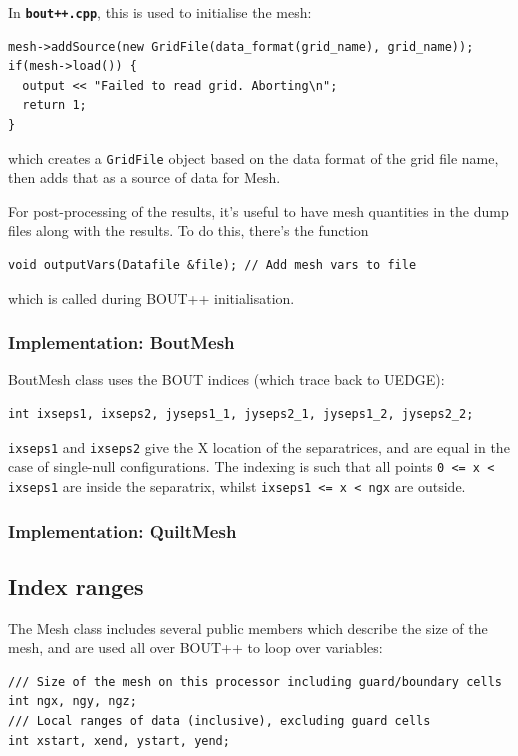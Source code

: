 \documentclass[12pt]{article}
\newcommand{\code}[1]{\texttt{#1}}
\newcommand{\file}[1]{\texttt{\bf #1}}
\begin{document}
In \file{bout++.cpp}, this is used to initialise the mesh:
\begin{lstlisting}
mesh->addSource(new GridFile(data_format(grid_name), grid_name));
if(mesh->load()) {
  output << "Failed to read grid. Aborting\n";
  return 1;
}
\end{lstlisting}
which creates a \code{GridFile} object based on the data format of 
the grid file name, then adds that as a source of data for Mesh.

For post-processing of the results, it's useful to have 
mesh quantities in the dump files along with the results. To do this,
there's the function
\begin{lstlisting}
void outputVars(Datafile &file); // Add mesh vars to file
\end{lstlisting}
which is called during BOUT++ initialisation.

\subsubsection{Implementation: BoutMesh}

BoutMesh class uses the BOUT indices (which trace back to UEDGE):
\begin{lstlisting}
int ixseps1, ixseps2, jyseps1_1, jyseps2_1, jyseps1_2, jyseps2_2;
\end{lstlisting}
\code{ixseps1} and \code{ixseps2} give the X location of the separatrices,
and are equal in the case of single-null configurations. The indexing
is such that all points \code{0 <= x < ixseps1} are inside the separatrix,
whilst \code{ixseps1 <= x < ngx} are outside.

\subsubsection{Implementation: QuiltMesh}





\subsection{Index ranges}

The Mesh class includes several public members which describe the
size of the mesh, and are used all over BOUT++ to loop over variables:
\begin{lstlisting}
/// Size of the mesh on this processor including guard/boundary cells
int ngx, ngy, ngz;  
/// Local ranges of data (inclusive), excluding guard cells
int xstart, xend, ystart, yend;
\end{lstlisting}
\end{document}
